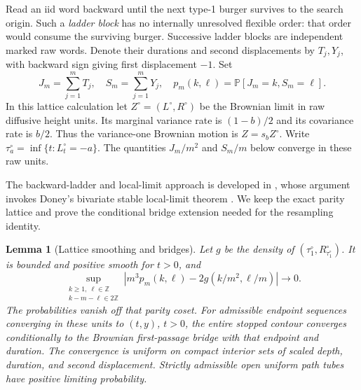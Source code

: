\documentclass[11pt]{article}
\numberwithin{equation}{section}
\newtheorem{lemma}[theorem]{Lemma}
\theoremstyle{definition}
\theoremstyle{remark}
\newcommand{\1}{\mathbf 1}
\begin{document}
Read an iid word backward until the next type-1 burger survives to the
search origin.  Such a \emph{ladder block} has no internally unresolved
flexible order: that order would consume the surviving burger.
Successive ladder blocks are independent marked raw words.  Denote
their durations and second displacements by \(T_j,Y_j\), with backward
sign giving first displacement \(-1\).  Set
\[
 J_m=\sum_{j=1}^mT_j,\quad S_m=\sum_{j=1}^mY_j,\quad
 p_m(k,\ell)=\mathbb P[J_m=k,S_m=\ell].
\]
In this lattice calculation let \(Z^\circ=(L^\circ,R^\circ)\)
be the Brownian limit in raw diffusive height units.  Its marginal
variance rate is \((1-b)/2\) and its covariance rate is \(b/2\).
Thus the variance-one Brownian motion is \(Z=s_bZ^\circ\).
Write \(\tau_a^\circ=\inf\{t:L_t^\circ=-a\}\).  The quantities
\(J_m/m^2\) and \(S_m/m\) below converge in these raw units.

The backward-ladder and local-limit approach is developed in
\citet[Section~2.1, Lemma~2.1, Proposition~2.2 and Lemma~2.3]{GwynneSunFKII},
whose argument invokes Doney's bivariate stable local-limit theorem \citep{DoneyBivariate}. We keep the
exact parity lattice and prove the conditional bridge extension needed
for the resampling identity.

\begin{lemma}[Lattice smoothing and bridges]\label{ker:ladder}
Let \(g\) be the density of \((\tau_1^\circ,R^\circ_{\tau_1^\circ})\).  It is bounded
and positive smooth for \(t>0\), and
\begin{equation}
 \sup_{\substack{k\ge1,\ \ell\in\mathbb Z\\k-m-\ell\in2\mathbb Z}}
 \left|m^3p_m(k,\ell)-2g(k/m^2,\ell/m)\right|\longrightarrow0.
 \label{ker:llt}
\end{equation}
The probabilities vanish off that parity coset.
For admissible endpoint sequences converging in these units to
\((t,y)\), \(t>0\), the entire stopped contour converges conditionally
to the Brownian first-passage bridge with that endpoint and duration.
The convergence is uniform on compact interior sets of scaled depth,
duration, and second displacement.  Strictly admissible open uniform
path tubes have positive limiting probability.
\end{lemma}
\end{document}
